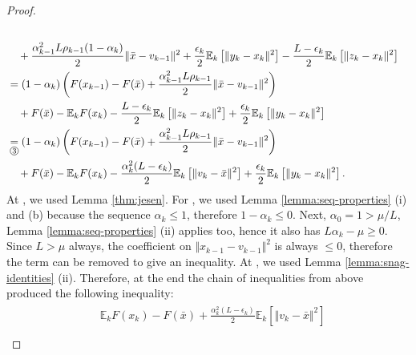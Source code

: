 \documentclass[12pt]{article}
\newcommand{\expect}{\ensuremath{\mathbb E}}
\begin{document}
\begin{proof}
{\begin{align*}
                \\&\quad 
                    + \frac{\alpha_{k - 1}^2L \rho_{k - 1}(1 - \alpha_k)}{2}\Vert \bar x - v_{k - 1}\Vert^2
                    + \frac{\epsilon_k}{2}\expect_k \left[\Vert y_k - x_k \Vert^2\right] 
                    - \frac{L - \epsilon_k}{2}\expect_k \left[\Vert z_k - x_k\Vert^2\right]
                \\&= 
                (1 - \alpha_k)\left(
                    F(x_{k - 1}) - F(\bar x)
                    + \frac{\alpha_{k - 1}^2L\rho_{k - 1}}{2}\Vert \bar x - v_{k - 1}\Vert^2
                \right)
                    \\ &\quad 
                    + F(\bar x) - \expect_kF(x_k) 
                    - \frac{L - \epsilon_k}{2}\expect_k \left[\Vert z_k - x_k\Vert^2\right]
                    + \frac{\epsilon_k}{2}\expect_k \left[\Vert y_k - x_k \Vert^2\right] 
                \\
                &\underset{\circled{3}}{=} 
                (1 - \alpha_k)\left(
                    F(x_{k - 1}) - F(\bar x)
                    + \frac{\alpha_{k - 1}^2L\rho_{k - 1}}{2}\Vert \bar x - v_{k - 1}\Vert^2
                \right)
                    \\ &\quad 
                    + F(\bar x) - \expect_kF(x_k) 
                    - \frac{\alpha_k^2(L - \epsilon_k)}{2}\expect_k \left[\Vert v_k - \bar x\Vert^2\right]
                    + \frac{\epsilon_k}{2}\expect_k \left[\Vert y_k - x_k \Vert^2\right]. 
            \end{align*}
            }
            At , we used Lemma \ref{thm:jesen}. 
            For , we used Lemma \ref{lemma:seq-properties} (i) and (b) because the sequence $\alpha_k \le 1$, therefore $1 - \alpha_k \le 0$. 
            Next, $\alpha_0 = 1 > \mu/L$, Lemma \ref{lemma:seq-properties} (ii) applies too, hence it also has $L\alpha_k - \mu \ge 0$. 
            Since $L > \mu$ always, the coefficient on $\Vert x_{k - 1} - v_{k - 1}\Vert^2$ is always $\le 0$, therefore the term can be removed to give an inequality. 
            At , we used Lemma \ref{lemma:snag-identities} (ii). 
            Therefore, at the end the chain of inequalities from above produced the following inequality: 
            \begin{align}\begin{split}
                & \expect_kF(x_k) - F(\bar x) 
                + \frac{\alpha_k^2(L - \epsilon_k)}{2}\expect_k \left[\Vert v_k - \bar x\Vert^2\right]
                \\

\end{split}
\end{align}
\end{proof}
\end{document}
